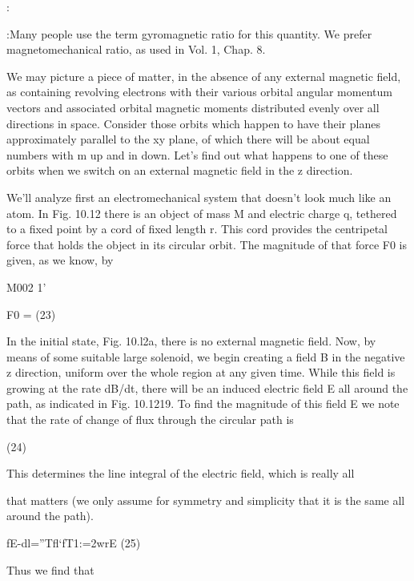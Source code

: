 :{:Many people use the term gyromagnetic ratio for this quantity. We prefer 
magnetomechanical ratio, as used in Vol. 1, Chap. 8.


We may picture a piece of matter, in the absence of any external
magnetic field, as containing revolving electrons with their various
orbital angular momentum vectors and associated orbital magnetic
moments distributed evenly over all directions in space. Consider
those orbits which happen to have their planes approximately parallel
to the xy plane, of which there will be about equal numbers with
m up and in down. Let's find out what happens to one of these orbits
when we switch on an external magnetic field in the z direction.

We'll analyze first an electromechanical system that doesn't look
much like an atom. In Fig. 10.12 there is an object of mass M and
electric charge q, tethered to a fixed point by a cord of fixed length r.
This cord provides the centripetal force that holds the object in its
circular orbit. The magnitude of that force F0 is given, as we
know, by
\begin{equation}
\end{equation}

M002
1'

F0 = (23)

In the initial state, Fig. 10.l2a, there is no external magnetic field.
Now, by means of some suitable large solenoid, we begin creating
a field B in the negative z direction, uniform over the whole region
at any given time. While this field is growing at the rate dB/dt, there
will be an induced electric field E all around the path, as indicated in
Fig. 10.1219. To find the magnitude of this field E we note that the
rate of change of flux through the circular path is
\begin{equation}
\end{equation}

(24)

This determines the line integral of the electric field, which is really all

that matters (we only assume for symmetry and simplicity that it
is the same all around the path).
\begin{equation}
\end{equation}

fE-dl=''Tfl‘fT1:=2wrE (25)

Thus we find that
\begin{equation}
\end{equation}

}
